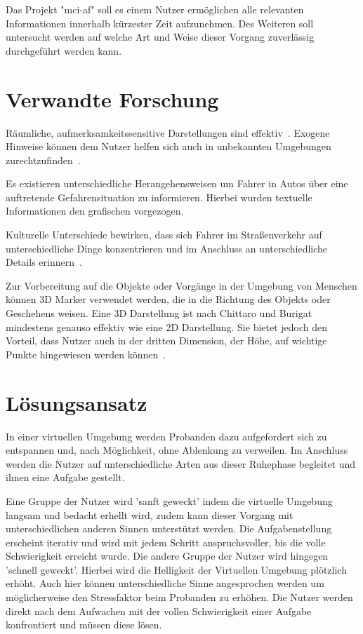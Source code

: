 \documentclass[a4paper, 11pt]{article}
\newcommand{\projectName}{mci-af}
\begin{document}
Das Projekt "\projectName" soll es einem Nutzer ermöglichen alle relevanten Informationen innerhalb kürzester Zeit aufzunehmen. Des Weiteren soll untersucht werden auf welche Art und Weise dieser Vorgang zuverlässig durchgeführt werden kann.

\section*{Verwandte Forschung}
Räumliche, aufmerksamkeitssensitive Darstellungen sind effektiv~\cite{bonanni2005attention}. Exogene Hinweise können dem Nutzer helfen sich auch in unbekannten Umgebungen zurechtzufinden~\cite{bonanni2005attention}.

Es existieren unterschiedliche Herangehensweisen um Fahrer in Autos über eine auftretende Gefahrensituation zu informieren. Hierbei wurden textuelle Informationen den grafischen vorgezogen.~\cite{green1995hazard}

Kulturelle Unterschiede bewirken, dass sich Fahrer im Straßenverkehr auf unterschiedliche Dinge konzentrieren und im Anschluss an unterschiedliche Details erinnern~\cite{yumiko2017VisAttention}.

Zur Vorbereitung auf die Objekte oder Vorgänge in der Umgebung von Menschen können 3D Marker verwendet werden, die in die Richtung des Objekts oder Geschehens weisen. Eine 3D Darstellung ist nach Chittaro und Burigat mindestens genauso effektiv wie eine 2D Darstellung. Sie bietet jedoch den Vorteil, dass Nutzer auch in der dritten Dimension, der Höhe, auf wichtige Punkte hingewiesen werden können~\cite{chittaro20043d}.

\section*{Lösungsansatz}
In einer virtuellen Umgebung werden Probanden dazu aufgefordert sich zu entspannen und, nach Möglichkeit, ohne Ablenkung zu verweilen. Im Anschluss werden die Nutzer auf unterschiedliche Arten aus dieser Ruhephase begleitet und ihnen eine Aufgabe gestellt. 

Eine Gruppe der Nutzer wird 'sanft geweckt' indem die virtuelle Umgebung langsam und bedacht erhellt wird, zudem kann dieser Vorgang mit unterschiedlichen anderen Sinnen unterstützt werden. Die Aufgabenstellung erscheint iterativ und wird mit jedem Schritt anspruchsvoller, bis die volle Schwierigkeit erreicht wurde. 
Die andere Gruppe der Nutzer wird hingegen 'schnell geweckt'. Hierbei wird die Helligkeit der Virtuellen Umgebung plötzlich erhöht. Auch hier können unterschiedliche Sinne angesprochen werden um möglicherweise den Stressfaktor beim Probanden zu erhöhen. Die Nutzer werden direkt nach dem Aufwachen mit der vollen Schwierigkeit einer Aufgabe konfrontiert und müssen diese lösen.
\end{document}
